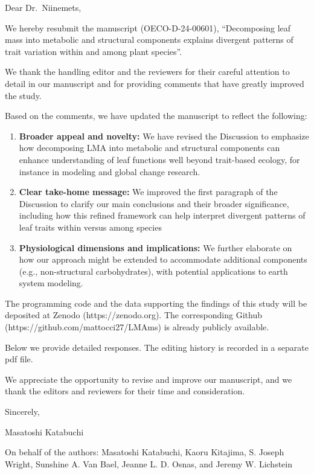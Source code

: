 \documentclass[
  12pt,
  letterpaper,
  DIV=11,
  numbers=noendperiod]{scrartcl}
\author{Masatoshi Katabuchi}
\date{2025-01-27}
\begin{document}
Dear Dr.~Niinemets,

We hereby resubmit the manuscript (OECO-D-24-00601), ``Decomposing leaf
mass into metabolic and structural components explains divergent
patterns of trait variation within and among plant species''.

We thank the handling editor and the reviewers for their careful
attention to detail in our manuscript and for providing comments that
have greatly improved the study.

Based on the comments, we have updated the manuscript to reflect the
following:

\begin{enumerate}
\def\labelenumi{\arabic{enumi}.}
\item
  \textbf{Broader appeal and novelty:} We have revised the Discussion to
  emphasize how decomposing LMA into metabolic and structural components
  can enhance understanding of leaf functions well beyond trait-based
  ecology, for instance in modeling and global change research.
\item
  \textbf{Clear take-home message:} We improved the first paragraph of
  the Discussion to clarify our main conclusions and their broader
  significance, including how this refined framework can help interpret
  divergent patterns of leaf traits within versus among species
\item
  \textbf{Physiological dimensions and implications:} We further
  elaborate on how our approach might be extended to accommodate
  additional components (e.g., non-structural carbohydrates), with
  potential applications to earth system modeling.
\end{enumerate}

The programming code and the data supporting the findings of this study
will be deposited at Zenodo (https://zenodo.org). The corresponding
Github (https://github.com/mattocci27/LMAms) is already publicly
available.

Below we provide detailed responses. The editing history is recorded in
a separate pdf file.

We appreciate the opportunity to revise and improve our manuscript, and
we thank the editors and reviewers for their time and consideration.

Sincerely,

Masatoshi Katabuchi

On behalf of the authors: Masatoshi Katabuchi, Kaoru Kitajima, S. Joseph
Wright, Sunshine A. Van Bael, Jeanne L. D. Osnas, and Jeremy W.
Lichstein
\end{document}
